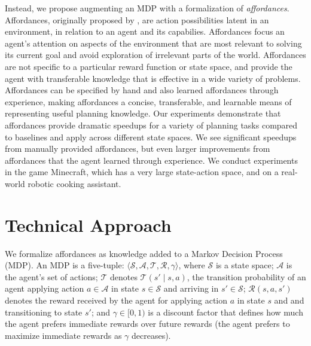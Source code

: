 \documentclass[letterpaper]{article}
\begin{document}
Instead, we propose augmenting an MDP with a formalization of {\em
  affordances}. Affordances, originally proposed by \citet{gibson77},
are action possibilities latent in an environment, in relation to an
agent and its capabilies.  Affordances focus an agent's attention on
aspects of the environment that are most relevant to solving its
current goal and avoid exploration of irrelevant parts of the
world. Affordances are not specific to a particular reward function or
state space, and provide the agent with transferable knowledge that is
effective in a wide variety of problems.  Affordances can be specified
by hand and also learned affordances through experience, making
affordances a concise, transferable, and learnable means of
representing useful planning knowledge.  Our experiments demonstrate
that affordances provide dramatic speedups for a variety of planning
tasks compared to baselines and apply across different state spaces.
We see significant speedups from manually provided affordances, but
even larger improvements from affordances that the agent learned
through experience.  We conduct experiments in the game Minecraft,
which has a very large state-action space, and on a real-world robotic
cooking assistant.


\section{Technical Approach}
\label{sec:affordances}

We formalize affordances as knowledge added to a Markov Decision Process
(MDP).  An MDP is a five-tuple: $\langle \mathcal{S}, \mathcal{A},
\mathcal{T}, \mathcal{R}, \gamma \rangle$, where $\mathcal{S}$ is a
state space; $\mathcal{A}$ is the agent's set of actions;
$\mathcal{T}$ denotes $\mathcal{T}(s' \mid s,a)$, the transition
probability of an agent applying action $a \in \mathcal{A}$ in state
$s \in \mathcal{S}$ and arriving in $s' \in \mathcal{S}$;
$\mathcal{R}(s,a,s')$ denotes the reward received by the agent for
applying action $a$ in state $s$ and and transitioning to state $s'$;
and $\gamma \in [0, 1)$ is a discount factor that defines how much the
agent prefers immediate rewards over future rewards (the agent
prefers to maximize immediate rewards as $\gamma$ decreases).
\end{document}
